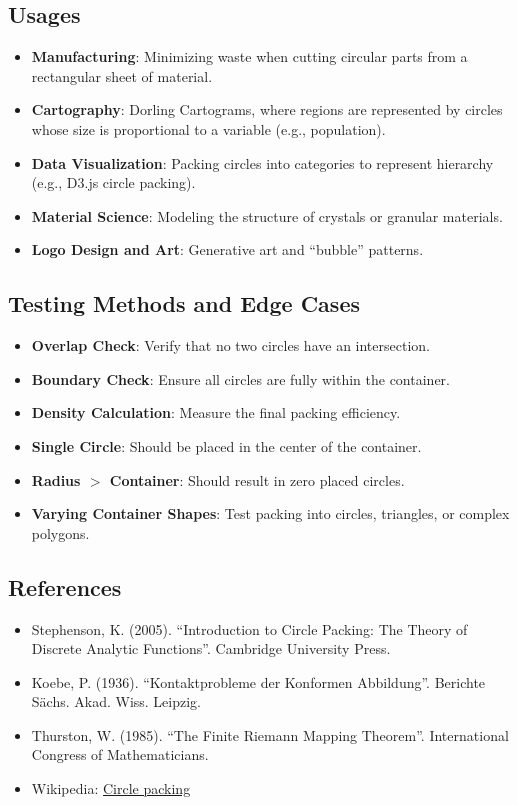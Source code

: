 \subsection{Usages}
\begin{itemize}
    \item \textbf{Manufacturing}: Minimizing waste when cutting circular parts from a rectangular sheet of material.
    \item \textbf{Cartography}: Dorling Cartograms, where regions are represented by circles whose size is proportional to a variable (e.g., population).
    \item \textbf{Data Visualization}: Packing circles into categories to represent hierarchy (e.g., D3.js circle packing).
    \item \textbf{Material Science}: Modeling the structure of crystals or granular materials.
    \item \textbf{Logo Design and Art}: Generative art and ``bubble'' patterns.
\end{itemize}

\subsection{Testing Methods and Edge Cases}
\begin{itemize}
    \item \textbf{Overlap Check}: Verify that no two circles have an intersection.
    \item \textbf{Boundary Check}: Ensure all circles are fully within the container.
    \item \textbf{Density Calculation}: Measure the final packing efficiency.
    \item \textbf{Single Circle}: Should be placed in the center of the container.
    \item \textbf{Radius $>$ Container}: Should result in zero placed circles.
    \item \textbf{Varying Container Shapes}: Test packing into circles, triangles, or complex polygons.
\end{itemize}

\subsection{References}
\begin{itemize}
    \item Stephenson, K. (2005). ``Introduction to Circle Packing: The Theory of Discrete Analytic Functions''. Cambridge University Press.
    \item Koebe, P. (1936). ``Kontaktprobleme der Konformen Abbildung''. Berichte S\"achs. Akad. Wiss. Leipzig.
    \item Thurston, W. (1985). ``The Finite Riemann Mapping Theorem''. International Congress of Mathematicians.
    \item Wikipedia: \href{https://en.wikipedia.org/wiki/Circle_packing}{Circle packing}
\end{itemize}

